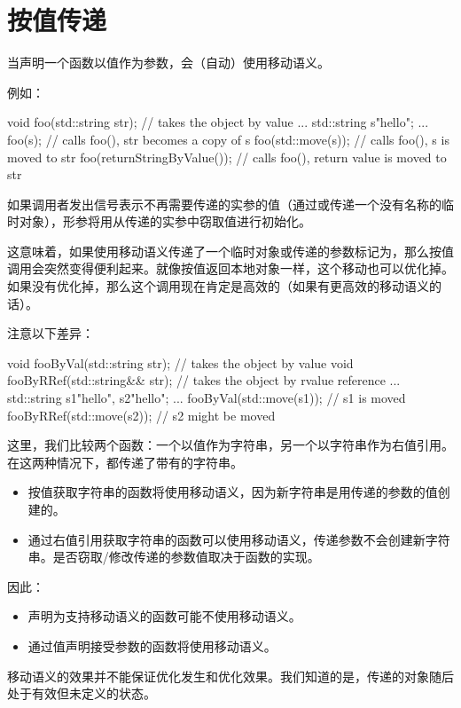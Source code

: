 \section{按值传递}
当声明一个函数以值作为参数，会（自动）使用移动语义。

例如：

\begin{cppcode}
void foo(std::string str); // takes the object by value
...
std::string s{"hello"};
...
foo(s); // calls foo(), str becomes a copy of s
foo(std::move(s)); // calls foo(), s is moved to str
foo(returnStringByValue()); // calls foo(), return value is moved to str
\end{cppcode}

如果调用者发出信号表示不再需要传递的实参的值（通过或传递一个没有名称的临时对象），形参将用从传递的实参中窃取值进行初始化。

这意味着，如果使用移动语义传递了一个临时对象或传递的参数标记为，那么按值调用会突然变得便利起来。就像按值返回本地对象一样，这个移动也可以优化掉。如果没有优化掉，那么这个调用现在肯定是高效的（如果有更高效的移动语义的话）。

注意以下差异：

\begin{cppcode}
void fooByVal(std::string str); // takes the object by value
void fooByRRef(std::string&& str); // takes the object by rvalue reference
...
std::string s1{"hello"}, s2{"hello"};
...
fooByVal(std::move(s1)); // s1 is moved
fooByRRef(std::move(s2)); // s2 might be moved
\end{cppcode}

这里，我们比较两个函数：一个以值作为字符串，另一个以字符串作为右值引用。在这两种情况下，都传递了带有的字符串。

\begin{itemize}
	\item 按值获取字符串的函数将使用移动语义，因为新字符串是用传递的参数的值创建的。
	\item 通过右值引用获取字符串的函数可以使用移动语义，传递参数不会创建新字符串。是否窃取/修改传递的参数值取决于函数的实现。
\end{itemize}

因此：

\begin{itemize}
	\item 声明为支持移动语义的函数可能不使用移动语义。
	\item 通过值声明接受参数的函数将使用移动语义。
\end{itemize}

移动语义的效果并不能保证优化发生和优化效果。我们知道的是，传递的对象随后处于有效但未定义的状态。













